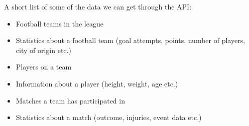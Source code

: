 \documentclass[Report.tex]{subfiles}
\begin{document}
A short list of some of the data we can get through the API:
\begin{itemize}
\item Football teams in the league
\item Statistics about a football team (goal attempts, points, number of players, city of origin etc.)
\item Players on a team
\item Information about a player (height, weight, age etc.)
\item Matches a team has participated in
\item Statistics about a match (outcome, injuries, event data etc.)
\end{itemize}
\end{document}
